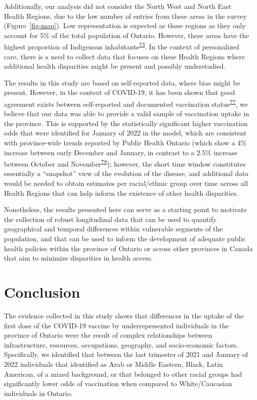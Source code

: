 \documentclass[
]{article}
\begin{document}
Additionally, our analysis did not consider the North West and North
East Health Regions, due to the low number of entries from these areas
in the survey (Figure~\ref{fig-map}). Low representation is expected as
these regions as they only account for 5\% of the total population of
Ontario. However, these areas have the highest proportion of Indigenous
inhabitants\textsuperscript{\protect\hyperlink{ref-ontariohealth}{73}}.
In the context of personalized care, there is a need to collect data
that focuses on these Health Regions where additional health disparities
might be present and possibly understudied.

The results in this study are based on self-reported data, where bias
might be present. However, in the context of COVID-19, it has been shown
that good agreement exists between self-reported and documented
vaccination
status\textsuperscript{\protect\hyperlink{ref-stephenson2022}{77}}, we
believe that our data was able to provide a valid sample of vaccination
uptake in the province. This is supported by the statistically
significant higher vaccination odds that were identified for January of
2022 in the model, which are consistent with province-wide trends
reported by Public Health Ontario (which show a 4\% increase between
early December and January, in contrast to a 2.5\% increase between
October and
November\textsuperscript{\protect\hyperlink{ref-ontario-covid}{78}});
however, the short time window constitutes essentially a ``snapshot''
view of the evolution of the disease, and additional data would be
needed to obtain estimates per racial/ethnic group over time across all
Health Regions that can help inform the existence of other health
disparities.

Nonetheless, the results presented here can serve as a starting point to
motivate the collection of robust longitudinal data that can be used to
quantify geographical and temporal differences within vulnerable
segments of the population, and that can be used to inform the
development of adequate public health policies within the province of
Ontario or across other provinces in Canada that aim to minimize
disparities in health access.

\hypertarget{conclusion}{%
\section{Conclusion}\label{conclusion}}

The evidence collected in this study shows that differences in the
uptake of the first dose of the COVID-19 vaccine by underrepresented
individuals in the province of Ontario were the result of complex
relationships between infrastructure, resources, occupations, geography,
and socio-economic factors. Specifically, we identified that between the
last trimester of 2021 and January of 2022 individuals that identified
as Arab or Middle Eastern, Black, Latin American, of a mixed background,
or that belonged to other racial groups had significantly lower odds of
vaccination when compared to White/Caucasian individuals in Ontario.
\end{document}
